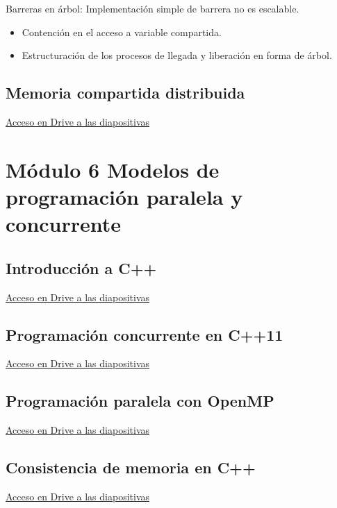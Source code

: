 \documentclass[12pt, twoside, openright]{report} %
\begin{document}
Barreras en árbol: Implementación simple de barrera no es
escalable.

\begin{itemize}

	\item Contención en el acceso a variable compartida.
	\item Estructuración de los procesos de llegada y liberación en forma
	      de árbol.
\end{itemize}

\section{Memoria compartida distribuida}
\href{https://drive.google.com/file/d/1AWL1dUJmXv9hWbRNhzXvDSwOfp3kdKvT}{Acceso en Drive a las diapositivas}

\chapter{Módulo 6 Modelos de programación paralela y concurrente}
\section{Introducción a C++}
\href{https://drive.google.com/file/d/16WyicNTcyCuIs7skhuuINuadUm4pd0zB}{Acceso en Drive a las diapositivas}

\section{Programación concurrente en C++11}
\href{https://drive.google.com/file/d/16GPhGhX0H2Lodr96h2EhhSjKW09-OaNz}{Acceso en Drive a las diapositivas}

\section{Programación paralela con OpenMP}
\href{https://drive.google.com/file/d/16T6CITaTrlgx8yCjz_-N2JN8bc5NS2Sc}{Acceso en Drive a las diapositivas}

\section{Consistencia de memoria en C++}
\href{https://drive.google.com/file/d/16Jh-MoiLHr5AXle2sYLMhbCXf1Djayb3}{Acceso en Drive a las diapositivas}
\end{document}
